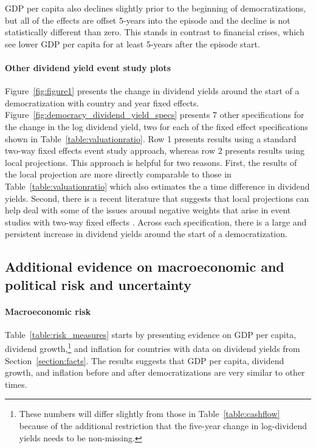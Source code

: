GDP per capita also declines slightly prior to the beginning of democratizations, but all of the effects are offset 5-years into the episode and the decline is not statistically different than zero. This stands in contrast to financial crises, which see lower GDP per capita for at least 5-years after the episode start.

\paragraph{Other dividend yield event study plots}

Figure~\ref{fig:figure1} presents the change in dividend yields around the start of a democratization with country and year fixed effects. Figure~\ref{fig:democracy_dividend_yield_specs} presents 7 other specifications for the change in the log dividend yield, two for each of the fixed effect specifications shown in Table~\ref{table:valuationratio}. Row 1 presents results using a standard two-way fixed effects event study approach, whereas row 2 presents results using \cite{Jorda2005} local projections. This approach is helpful for two reasons. First, the results of the local projection are more directly comparable to those in Table~\ref{table:valuationratio} which also estimates the a time difference in dividend yields. Second, there is a recent literature that suggests that local projections can help deal with some of the issues around negative weights that arise in event studies with two-way fixed effects \cite{Dube2025}. Across each specification, there is a large and persistent increase in dividend yields around the start of a democratization. 

\newpage


\subsection{Additional evidence on macroeconomic and political risk and uncertainty}\label{section:risk_app}

\paragraph{Macroeconomic risk} 
Table~\ref{table:risk_measures} starts by presenting evidence on GDP per capita, dividend growth,\footnote{These numbers will differ slightly from those in Table~\ref{table:cashflow} because of the additional restriction that the five-year change in log-dividend yields needs to be non-missing.} and inflation for countries with data on dividend yields from Section~\ref{section:facts}.  The results suggests that GDP per capita, dividend growth, and inflation before and after democratizations are very similar to other times.

